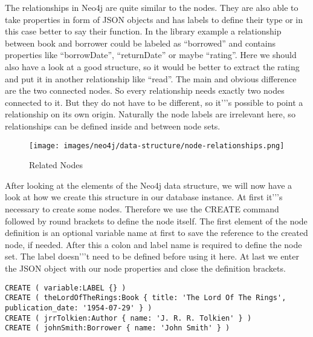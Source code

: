The relationships in Neo4j are quite similar to the nodes. They are also able to take properties in form of JSON objects and has labels to define their type or in this case better to say their function. In the library example a relationship between book and borrower could be labeled as “borrowed” and contains properties like “borrowDate”, “returnDate” or maybe “rating”. Here we should also have a look at a good structure, so it would be better to extract the rating and put it in another relationship like “read”.
The main and obvious difference are the two connected nodes. So every relationship needs exactly two nodes connected to it. But they do not have to be different, so it'’'s possible to point a relationship on its own origin. Naturally the node labels are irrelevant here, so relationships can be defined inside and between node sets.
\cite["Relationships", para. 1]{NeoTechnologyInc.2017c} \cite[p. 81-82]{Gupta.2015} \cite[slide 22-25]{Hunger.2013}

\begin{figure}[H]
	\texttt{[image: images/neo4j/data-structure/node-relationships.png]}
	\caption{Related Nodes}
\end{figure}

After looking at the elements of the Neo4j data structure, we will now have a look at how we create this structure in our database instance.
At first it'’'s necessary to create some nodes. Therefore we use the CREATE command followed by round brackets to define the node itself. The first element of the node definition is an optional variable name at first to save the reference to the created node, if needed. After this a colon and label name is required to define the node set. The label doesn'’'t need to be defined before using it here. At last we enter the JSON object with our node properties and close the definition brackets.
\cite["Create a Record for Yourself", para. 1]{NeoTechnologyInc.2017d} \cite[p. 80]{Gupta.2015}

\begin{lstlisting}[frame=single, caption=Create Database, label=creategraphdb]
CREATE ( variable:LABEL {} )
CREATE ( theLordOfTheRings:Book { title: 'The Lord Of The Rings', publication_date: '1954-07-29' } )
CREATE ( jrrTolkien:Author { name: 'J. R. R. Tolkien' } )
CREATE ( johnSmith:Borrower { name: 'John Smith' } )
\end{lstlisting}


